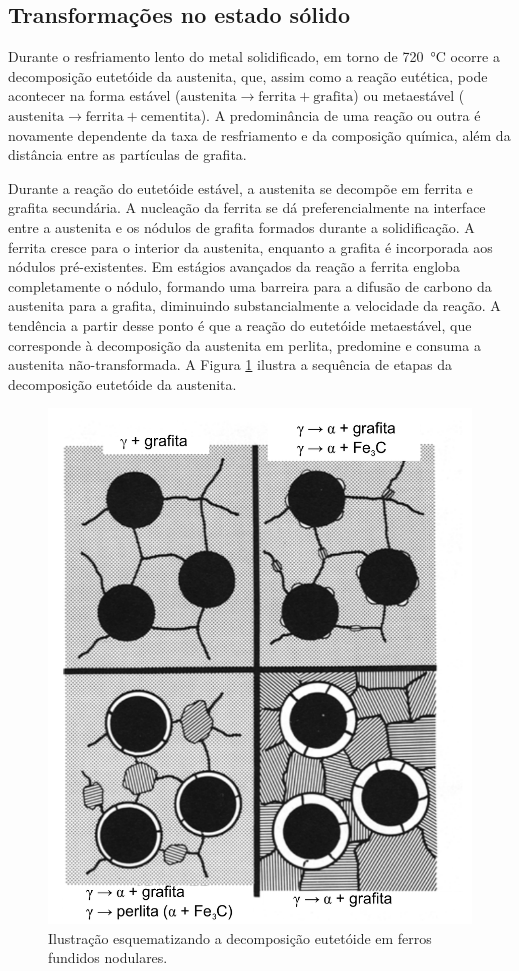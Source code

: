 \subsection{Transformações no estado sólido}

Durante o resfriamento lento do metal solidificado, em torno de \SI{720}{\degreeCelsius} ocorre a decomposição eutetóide da austenita, que, assim como a reação eutética, pode acontecer na forma estável ($\text{austenita} \rightarrow \text{ferrita} + \text{grafita}$) ou metaestável ($\text{austenita} \rightarrow \text{ferrita} + \text{cementita}$). A predominância de uma reação ou outra é novamente dependente da taxa de resfriamento e da composição química, além da distância entre as partículas de grafita.

Durante a reação do eutetóide estável, a austenita se decompõe em ferrita e grafita secundária. A nucleação da ferrita se dá preferencialmente na interface entre a austenita e os nódulos de grafita formados durante a solidificação. A ferrita cresce para o interior da austenita, enquanto a grafita é incorporada aos nódulos pré-existentes. Em estágios avançados da reação a ferrita engloba completamente o nódulo, formando uma barreira para a difusão de carbono da austenita para a grafita, diminuindo substancialmente a velocidade da reação. A tendência a partir desse ponto é que a reação do eutetóide metaestável, que corresponde à decomposição da austenita em perlita, predomine e consuma a austenita não-transformada. A Figura \ref{fig:matriz_fofo} ilustra a sequência de etapas da decomposição eutetóide da austenita.

\begin{figure}
  \includegraphics[width=.6\textwidth]{img/matrizFofo.pdf}
  \caption{Ilustração esquematizando a decomposição eutetóide em ferros fundidos nodulares\cite{Johnson1978}.}
  \label{fig:matriz_fofo}
\end{figure}

